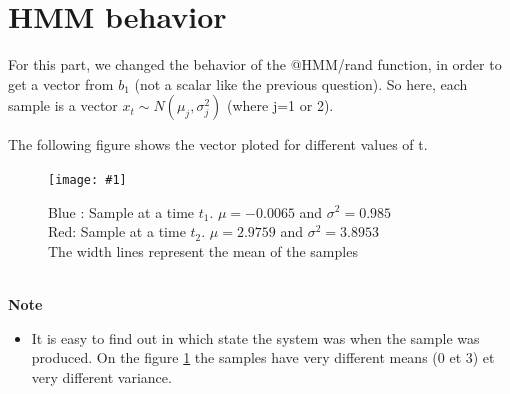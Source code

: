 \documentclass[a4paper]{report}
\newcommand{\img}[3]{\begin{figure}[!h] \centering \texttt{[image: \#1]}\captionsetup{justification=centering} \caption{#3} \label{#1} \end{figure}}
\newenvironment{pushright}[1]{\textbf{#1}
\begin{itemize}\item[\hspace{12pt}]}{\end{itemize}
}
\begin{document}
\section{HMM behavior}
For this part, we changed the behavior of the @HMM/rand function, in order to get a vector from $b_{1}$ (not a scalar like the previous question). So here, each sample is a vector $x_{t} \sim N(\mu_j,\sigma_j^2)$ (where j=1 or 2).

The following figure shows the vector ploted for different values of t.
\img{etude_hmmrand}{0.4}{{\color{blue}Blue : Sample at a time $t_1$. $\mu=-0.0065$ and $\sigma^2=0.985$}\\ {\color{red}Red: Sample at a time $t_2$. $\mu=2.9759$ and $\sigma^2=3.8953$}\\ The width lines represent the mean of the samples}\\
\begin{pushright}{Note}
  It is easy to find out in which state the system was when the sample was produced. On the figure \ref{etude_hmmrand} the samples have very different means (0 et 3) et very different variance.
\end{pushright}
\end{document}
